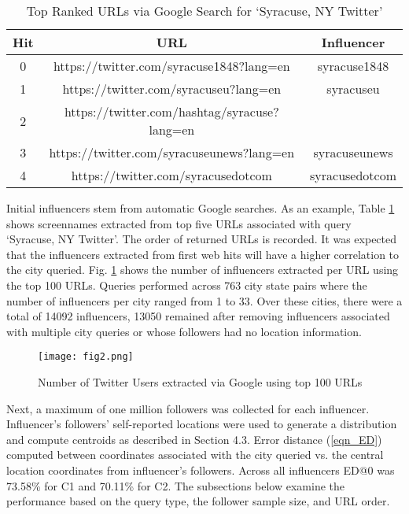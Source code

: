 \begin{table}
\small
\caption{Top Ranked URLs via Google Search for `Syracuse, NY Twitter'}
\label{table_4_3}
\begin{center}
\begin{tabular}{|c|c|c|}
\hline
\bfseries Hit & \bfseries URL & \bfseries Influencer\\
\hline
0&https://twitter.com/syracuse1848?lang=en&syracuse1848\\
\hline
1&https://twitter.com/syracuseu?lang=en&syracuseu\\
\hline
2&https://twitter.com/hashtag/syracuse?lang=en&\\
\hline
3&https://twitter.com/syracuseunews?lang=en&syracuseunews\\
\hline
4&https://twitter.com/syracusedotcom&syracusedotcom\\
\hline
\end{tabular}
\end{center}
\end{table}

Initial influencers stem from automatic Google searches. As an example, Table \ref{table_4_3} shows screennames extracted from top five URLs associated with query `Syracuse, NY Twitter'. The order of returned URLs is recorded. It was expected that the influencers extracted from first web hits will have a higher correlation to the city queried. Fig. \ref{fig_ch4_2} shows the number of influencers extracted per URL using the top 100 URLs. Queries performed across 763 city state pairs where the number of influencers per city ranged from 1 to 33. Over these cities, there were a total of 14092 influencers, 13050 remained after removing influencers associated with multiple city queries or whose followers had no location information.

\begin{figure}[htbp]
\centerline{\texttt{[image: fig2.png]}}
\caption{Number of Twitter Users extracted via Google using top 100 URLs}
\label{fig_ch4_2}
\end{figure}

Next, a maximum of one million followers was collected for each influencer. Influencer's followers' self-reported locations were used to generate a distribution and compute centroids as described in Section 4.3. Error distance (\ref{eqn_ED}) computed between coordinates associated with the city queried vs. the central location coordinates from influencer's followers. Across all influencers ED@0 was 73.58\% for C1 and 70.11\% for C2. The subsections below examine the performance based on the query type, the follower sample size, and URL order.

